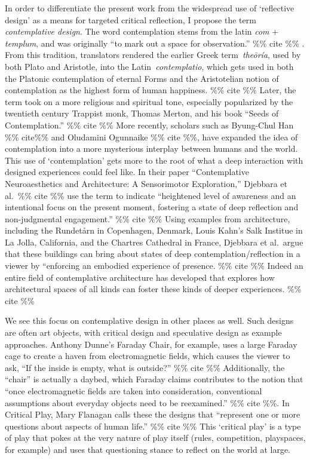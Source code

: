 \documentclass[
]{article}
\begin{document}
In order to differentiate the present work from the widespread use of
`reflective design' as a means for targeted critical reflection, I
propose the term \emph{contemplative design}. The word contemplation
stems from the latin \emph{com} + \emph{templum}, and was originally
``to mark out a space for observation.'' \%\% cite \%\% . From this
tradition, translators rendered the earlier Greek term~\emph{theōría},
used by both Plato and Aristotle, into the Latin~\emph{contemplatio},
which gets used in both the Platonic contemplation of eternal Forms and
the Aristotelian notion of contemplation as the highest form of human
happiness. \%\% cite \%\% Later, the term took on a more religious and
spiritual tone, especially popularized by the twentieth century Trappist
monk, Thomas Merton, and his book ``Seeds of Contemplation.'' \%\% cite
\%\% More recently, scholars such as Byung-Chul Han \%\% cite\%\% and
Oludamini Ogunnaike \%\% cite \%\%, have expanded the idea of
contemplation into a more mysterious interplay between humans and the
world. This use of `contemplation' gets more to the root of what a deep
interaction with designed experiences could feel like. In their paper
``Contemplative Neuroaesthetics and Architecture: A Sensorimotor
Exploration,'' Djebbara et al.~\%\% cite \%\% use the term to indicate
``heightened level of awareness and an intentional focus on the present
moment, fostering a state of deep reflection and non-judgmental
engagement.'' \%\% cite \%\% Using examples from architecture, including
the Rundetårn in Copenhagen, Denmark, Louis Kahn's Salk Institue in La
Jolla, California, and the Chartres Cathedral in France, Djebbara et
al.~argue that these buildings can bring about states of deep
contemplation/reflection in a viewer by ``enforcing an embodied
experience of presence. \%\% cite \%\% Indeed an entire field of
contemplative architecture has developed that explores how architectural
spaces of all kinds can foster these kinds of deeper experiences. \%\%
cite \%\%

We see this focus on contemplative design in other places as well. Such
designs are often art objects, with critical design and speculative
design as example approaches. Anthony Dunne's Faraday Chair, for
example, uses a large Faraday cage to create a haven from
electromagnetic fields, which causes the viewer to ask, ``If the inside
is empty, what is outside?'' \%\% cite \%\% Additionally, the ``chair''
is actually a daybed, which Faraday claims contributes to the notion
that ``once electromagnetic fields are taken into consideration,
conventional assumptions about everyday objects need to be reexamined.''
\%\% cite \%\%. In Critical Play, Mary Flanagan calls these the designs
that ``represent one or more questions about aspects of human life.''
\%\% cite \%\% This `critical play' is a type of play that pokes at the
very nature of play itself (rules, competition, playspaces, for example)
and uses that questioning stance to reflect on the world at large.
\end{document}
